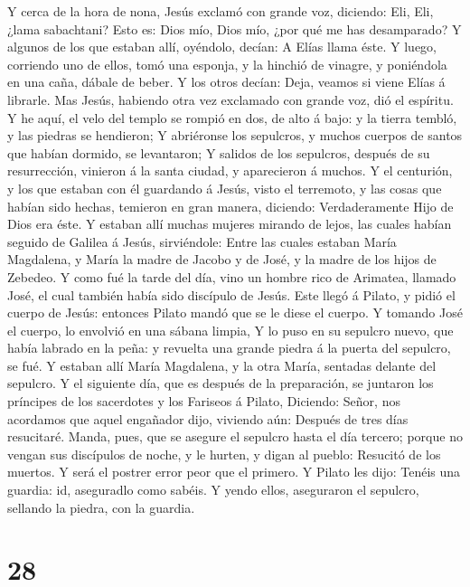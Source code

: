  Y cerca de la hora de nona, Jesús exclamó con grande voz,
diciendo: Eli, Eli, ¿lama sabachtani? Esto es: Dios mío, Dios mío, ¿por
qué me has desamparado?  Y algunos de los que estaban allí,
oyéndolo, decían: A Elías llama éste.  Y luego, corriendo
uno de ellos, tomó una esponja, y la hinchió de vinagre, y poniéndola en
una caña, dábale de beber.  Y los otros decían: Deja,
veamos si viene Elías á librarle.  Mas Jesús, habiendo otra
vez exclamado con grande voz, dió el espíritu.  Y he aquí,
el velo del templo se rompió en dos, de alto á bajo: y la tierra tembló,
y las piedras se hendieron;  Y abriéronse los sepulcros, y
muchos cuerpos de santos que habían dormido, se levantaron;
 Y salidos de los sepulcros, después de su resurrección,
vinieron á la santa ciudad, y aparecieron á muchos.  Y el
centurión, y los que estaban con él guardando á Jesús, visto el
terremoto, y las cosas que habían sido hechas, temieron en gran manera,
diciendo: Verdaderamente Hijo de Dios era éste.  Y estaban
allí muchas mujeres mirando de lejos, las cuales habían seguido de
Galilea á Jesús, sirviéndole:  Entre las cuales estaban
María Magdalena, y María la madre de Jacobo y de José, y la madre de los
hijos de Zebedeo.  Y como fué la tarde del día, vino un
hombre rico de Arimatea, llamado José, el cual también había sido
discípulo de Jesús.  Este llegó á Pilato, y pidió el cuerpo
de Jesús: entonces Pilato mandó que se le diese el cuerpo. 
Y tomando José el cuerpo, lo envolvió en una sábana limpia,
 Y lo puso en su sepulcro nuevo, que había labrado en la
peña: y revuelta una grande piedra á la puerta del sepulcro, se fué.
 Y estaban allí María Magdalena, y la otra María, sentadas
delante del sepulcro.  Y el siguiente día, que es después
de la preparación, se juntaron los príncipes de los sacerdotes y los
Fariseos á Pilato,  Diciendo: Señor, nos acordamos que
aquel engañador dijo, viviendo aún: Después de tres días resucitaré.
 Manda, pues, que se asegure el sepulcro hasta el día
tercero; porque no vengan sus discípulos de noche, y le hurten, y digan
al pueblo: Resucitó de los muertos. Y será el postrer error peor que el
primero.  Y Pilato les dijo: Tenéis una guardia: id,
aseguradlo como sabéis.  Y yendo ellos, aseguraron el
sepulcro, sellando la piedra, con la guardia.

\hypertarget{section-27}{%
\section{28}\label{section-27}}

